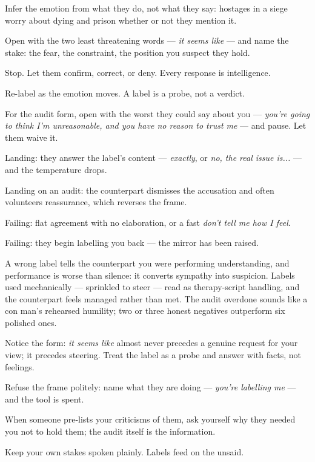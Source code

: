 \begin{application}
  \item Infer the emotion from what they do, not what they say: hostages in a siege worry about dying and prison whether or not they mention it.
  \item Open with the two least threatening words --- \emph{it seems like} --- and name the stake: the fear, the constraint, the position you suspect they hold.
  \item Stop. Let them confirm, correct, or deny. Every response is intelligence.
  \item Re-label as the emotion moves. A label is a probe, not a verdict.
  \item For the audit form, open with the worst they could say about you --- \emph{you're going to think I'm unreasonable, and you have no reason to trust me} --- and pause. Let them waive it.
\end{application}
\begin{feedback}
  \item Landing: they answer the label's content --- \emph{exactly}, or \emph{no, the real issue is...} --- and the temperature drops.
  \item Landing on an audit: the counterpart dismisses the accusation and often volunteers reassurance, which reverses the frame.
  \item Failing: flat agreement with no elaboration, or a fast \emph{don't tell me how I feel}.
  \item Failing: they begin labelling you back --- the mirror has been raised.
\end{feedback}
\begin{failure}
A wrong label tells the counterpart you were performing understanding, and performance is worse than silence: it converts sympathy into suspicion. Labels used mechanically --- sprinkled to steer --- read as therapy-script handling, and the counterpart feels managed rather than met. The audit overdone sounds like a con man's rehearsed humility; two or three honest negatives outperform six polished ones.
\end{failure}
\begin{countermeasures}
  \item Notice the form: \emph{it seems like} almost never precedes a genuine request for your view; it precedes steering. Treat the label as a probe and answer with facts, not feelings.
  \item Refuse the frame politely: name what they are doing --- \emph{you're labelling me} --- and the tool is spent.
  \item When someone pre-lists your criticisms of them, ask yourself why they needed you not to hold them; the audit itself is the information.
  \item Keep your own stakes spoken plainly. Labels feed on the unsaid.
\end{countermeasures}

\seesources
{}

